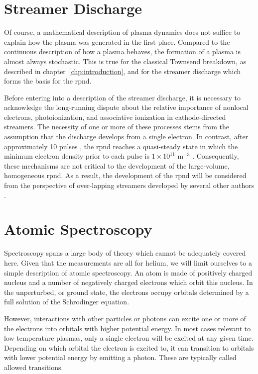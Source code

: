 \section{Streamer Discharge}
Of course, a mathematical description of plasma dynamics does not
suffice to explain how the plasma was generated in the first place.
Compared to the continuous description of how a plasma behaves, the
formation of a plasma is almost always stochastic. This is true for the
classical Townsend breakdown, as described in
chapter~\ref{chp:introduction}, and for the streamer discharge which
forms the basis for the \acs{rpnd}.

Before entering into a description of the streamer discharge, it is
necessary to acknowledge the long-running dispute about the relative
importance of nonlocal electrons, photoionization, and associative
ionization \cite{Kunhardt1988, Babich1990} in cathode-directed
streamers. The necessity of one or more of these processes stems from
the assumption that the discharge develops from a single electron. In
contrast, after approximately 10 pulses \cite{Pancheshnyi2006}, the
\acs{rpnd} reaches a quasi-steady state in which the minimum electron
density prior to each pulse is $1\times10^{11}$ m$^{-3}$
\cite{Weatherford2012a}. Consequently, these mechanisms are not critical
to the development of the large-volume, homogeneous \acs{rpnd}. As a
result, the development of the \acs{rpnd} will be considered from the
perspective of over-lapping streamers developed by several other authors
\cite{Mesyats1972, Levatter1980}.



\section{Atomic Spectroscopy}

Spectroscopy spans a large body of theory which cannot be adequately
covered here. Given that the measurements are all for helium, we will
limit ourselves to a simple description of atomic spectroscopy. An atom
is made of positively charged nucleus and a number of negatively charged
electrons which orbit this nucleus. In the unperturbed, or ground state,
the electrons occupy orbitals determined by a full solution of the
Schrodinger equation.

However, interactions with other particles or photons can excite one or
more of the electrons into orbitals with higher potential energy. In
most cases relevant to low temperature plasmas, only a single electron
will be excited at any given time. Depending on which orbital the
electron is excited to, it can transition to orbitals with lower
potential energy by emitting a photon. These are typically called
allowed transitions.

